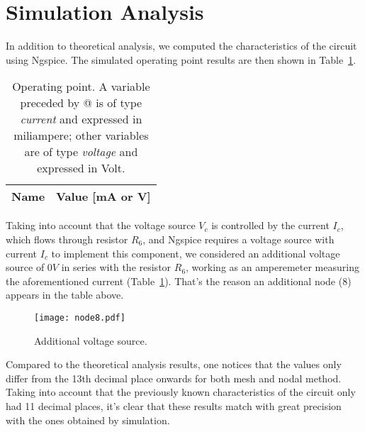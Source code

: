 \section{Simulation Analysis}
\label{sec:simulation}

In addition to theoretical analysis, we computed the characteristics of the circuit using Ngspice. The simulated operating point results are then shown in Table~\ref{tab:op}.

\vspace{1mm}

\begin{table}[H]
  \centering
  \begin{tabular}{|l|r|}
    \hline    
    {\bf Name} & {\bf Value [mA or V]} \\ \hline
    
  \end{tabular}
  \caption{Operating point. A variable preceded by @ is of type {\em current}
    and expressed in miliampere; other variables are of type {\it voltage} and expressed in
    Volt.}
  \label{tab:op}
\end{table}

Taking into account that the voltage source $V_c$ is controlled by the current $I_c$, which flows through resistor $R_6$, and Ngspice requires a voltage source with current $I_c$ to implement this component, we considered an additional voltage source of $0V$ in series with the resistor $R_6$, working as an amperemeter measuring the aforementioned current (Table~\ref{fig:node8}). That's the reason an additional node (8) appears in the table above.

\begin{figure}[H] \centering
\texttt{[image: node8.pdf]}
\caption{Additional voltage source.}
\label{fig:node8}
\end{figure}

Compared to the theoretical analysis results, one notices that the values only differ from the 13th decimal place onwards for both mesh and nodal method. Taking into account that the previously known characteristics of the circuit only had 11 decimal places, it's clear that these results match with great precision with the ones obtained by simulation.

